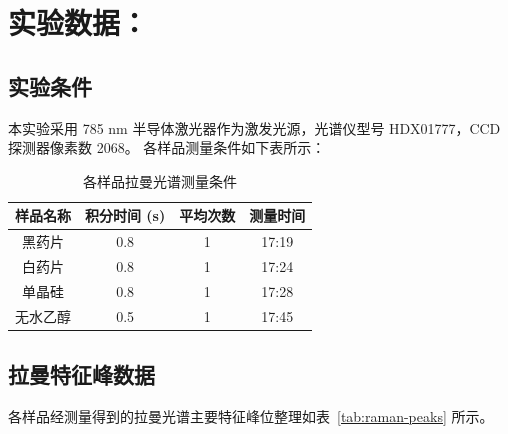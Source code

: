 \section{实验数据：}

\subsection{实验条件}

本实验采用 785 nm 半导体激光器作为激发光源，光谱仪型号 HDX01777，CCD 探测器像素数 2068。
各样品测量条件如下表所示：

\begin{table}[htbp]
    \centering
    \caption{各样品拉曼光谱测量条件}
    \label{tab:conditions}
    \begin{tabular}{cccc}
        \hline
        \textbf{样品名称} & \textbf{积分时间 (s)} & \textbf{平均次数} & \textbf{测量时间} \\
        \hline
        黑药片   & 0.8 & 1 & 17:19 \\
        白药片   & 0.8 & 1 & 17:24 \\
        单晶硅   & 0.8 & 1 & 17:28 \\
        无水乙醇 & 0.5 & 1 & 17:45 \\
        \hline
    \end{tabular}
\end{table}

\subsection{拉曼特征峰数据}

各样品经测量得到的拉曼光谱主要特征峰位整理如表~\ref{tab:raman-peaks} 所示。

